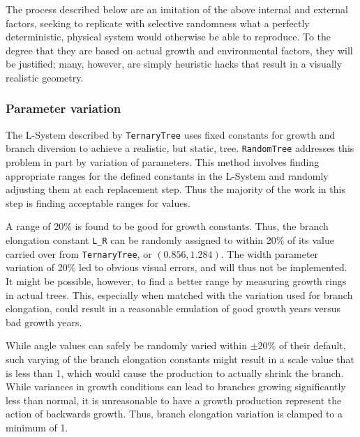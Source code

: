\documentclass{article}
\newcommand{\tab}{\hspace*{2em}}
\begin{document}
    \tab The process described below are an imitation of the above internal and external factors,
seeking to replicate
with selective randomness what a perfectly deterministic, physical system would otherwise be able
to reproduce. To the degree that they are based on actual growth and environmental factors, they
will be justified; many, however, are simply heuristic hacks that result in a visually realistic geometry.


            \subsubsection{Parameter variation}
    \tab The L-System described by \verb|TernaryTree| uses fixed constants for growth and branch
diversion to achieve a realistic, but static, tree. \verb|RandomTree| addresses this problem in
part by variation of parameters\cite{abp96}. This method involves finding appropriate ranges for
the defined constants in the L-System and randomly adjusting them at each replacement step. Thus
the majority of the work in this step is finding acceptable ranges for values.

    \tab A range of 20\% is found to be good for growth constants\cite{takenaka94}. Thus, the
branch elongation constant \verb|L_R| can be randomly assigned to within 20\% of its value carried
over from \verb|TernaryTree|, or $(0.856, 1.284)$. The width parameter variation of 20\% led to
obvious visual errors, and will thus not be
implemented. It might be possible, however, to find a better range by measuring growth rings in
actual trees. This, especially when matched with the variation used for branch elongation, could
result in a reasonable emulation of good growth years versus bad growth years.

    \tab While angle values can safely be randomly varied within $\pm20\%$ of their default,
such varying of the branch elongation constants might result in a scale value that is less than 1,
which would cause the production to actually shrink the branch. While variances in growth conditions
can lead to branches growing significantly less than normal, it is unreasonable to have a growth
production represent the action of backwards growth. Thus, branch elongation variation is clamped
to a minimum of 1.
\end{document}
